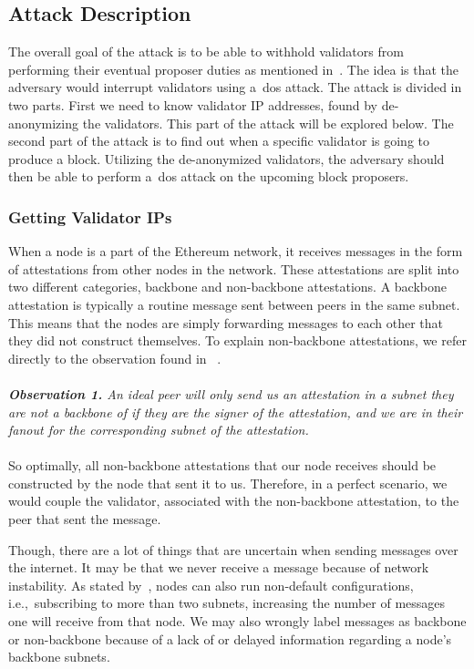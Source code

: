 \subsection{Attack Description}\label{subsec:attack-description}
The overall goal of the attack is to be able to withhold validators from performing their eventual proposer duties as mentioned in~\cite{EthereumAttackDefense2024}.
The idea is that the adversary would interrupt validators using a~\gls{dos} attack.
The attack is divided in two parts.
First we need to know validator IP addresses, found by de-anonymizing the validators.
This part of the attack will be explored below.
The second part of the attack is to find out when a specific validator is going to produce a block.
Utilizing the de-anonymized validators, the adversary should then be able to perform a~\gls{dos} attack on the upcoming block proposers.

\subsubsection{Getting Validator IPs}
When a node is a part of the Ethereum network,
it receives messages in the form of attestations from other nodes in the network.
These attestations are split into two different categories, backbone and non-backbone attestations.
A backbone attestation is typically a routine message sent between peers in the same subnet.
This means that the nodes are simply forwarding messages to each other that they did not construct themselves.
To explain non-backbone attestations,
we refer directly to the observation found in ~\cite{heimbach2024deanonymizingethereumvalidatorsp2p}.
\\\\
\textit{\textbf{Observation 1.} An ideal peer will only send us an attestation in a subnet they are not a backbone of
if they are the signer of the attestation,
     and we are in their fanout for the corresponding subnet of the attestation.}
\\\\

So optimally, all non-backbone attestations that our node receives should be constructed by the node that sent it to us.
Therefore, in a perfect scenario,
we would couple the validator, associated with the non-backbone attestation, to the peer that sent the message.

Though, there are a lot of things that are uncertain when sending messages over the internet.
It may be that we never receive a message because of network instability.
As stated by~\cite{heimbach2024deanonymizingethereumvalidatorsp2p}, nodes can also run non-default configurations,
i.e.,\ subscribing to more than two subnets, increasing the number of messages one will receive from that node.
We may also wrongly label messages as backbone or non-backbone because of a lack of or delayed information regarding a node's backbone subnets.

